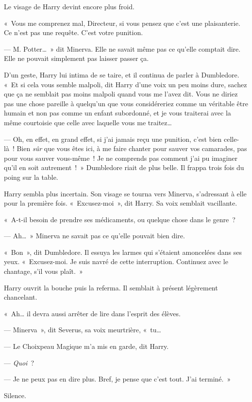 Le visage de Harry devint encore plus froid.

«~Vous me comprenez mal, Directeur, si vous pensez que c'est une plaisanterie.
Ce n'est pas une requête.
C'est votre punition.

--- M. Potter…~»
dit Minerva.
Elle ne savait même pas ce qu'elle comptait dire.
Elle ne pouvait simplement pas laisser passer ça.

D'un geste, Harry lui intima de se taire, et il continua de parler à Dumbledore.
«~Et si cela vous semble malpoli, dit Harry d’une voix un peu moins dure, sachez que ça ne semblait pas moins malpoli quand vous me l'avez dit.
Vous ne diriez pas une chose pareille à quelqu'un que vous considéreriez comme un véritable être humain et non pas comme un enfant subordonné, et je vous traiterai avec la même courtoisie que celle avec laquelle vous me traitez…

--- Oh, en effet, en grand effet, si j'ai jamais reçu une punition, c'est bien celle-là~!
Bien \emph{sûr} que vous êtes ici, à me faire chanter pour sauver vos camarades, pas pour vous sauver vous-même~!
Je ne comprends pas comment j'ai pu imaginer qu'il en soit autrement~!~»
Dumbledore riait de plus belle.
Il frappa trois fois du poing sur la table.

Harry sembla plus incertain.
Son visage se tourna vers Minerva, s'adressant à elle pour la première fois.
«~Excusez-moi~», dit Harry.
Sa voix semblait vacillante.

«~A-t-il besoin de prendre ses médicaments, ou quelque chose dans le genre~?

--- Ah…~» Minerva ne savait pas ce qu'elle pouvait bien dire.

«~Bon~», dit Dumbledore.
Il essuya les larmes qui s'étaient amoncelées dans ses yeux.
«~Excusez-moi.
Je suis navré de cette interruption.
Continuez avec le chantage, s'il vous plaît.~»

Harry ouvrit la bouche puis la referma.
Il semblait à présent légèrement chancelant.

«~Ah… il devra aussi arrêter de lire dans l'esprit des élèves.

--- Minerva~», dit Severus, sa voix meurtrière, «~tu…

--- Le Choixpeau Magique m'a mis en garde, dit Harry.

--- \emph{Quoi}~?

--- Je ne peux pas en dire plus.
Bref, je pense que c'est tout.
J'ai terminé.~»

Silence.

